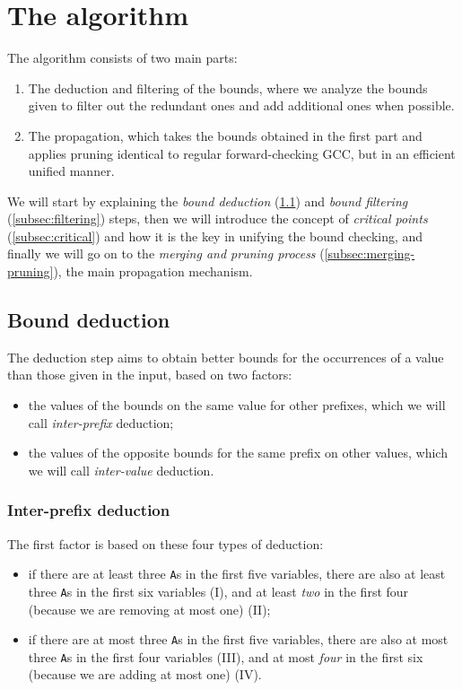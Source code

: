 \documentclass[a4paper,10pt]{article}
\begin{document}
\section{The algorithm}
The algorithm consists of two main parts:
\begin{enumerate}
    \item The deduction and filtering of the bounds, where we analyze the bounds given to filter out the redundant ones and add additional ones when possible.
    \item The propagation, which takes the bounds obtained in the first part and applies pruning identical to regular forward-checking GCC, but in an efficient unified manner.
\end{enumerate}

We will start by explaining the \emph{bound deduction} (\ref{subsec:deduction}) and \emph{bound filtering} (\ref{subsec:filtering}) steps, then we will introduce the concept of \emph{critical points} (\ref{subsec:critical}) and how it is the key in unifying the bound checking, and finally we will go on to the \emph{merging and pruning process} (\ref{subsec:merging-pruning}), the main propagation mechanism.

\subsection{Bound deduction}
\label{subsec:deduction}

The deduction step aims to obtain better bounds for the occurrences of a value than those given in the input, based on two factors:
\begin{itemize}
    \item the values of the bounds on the same value for other prefixes, which we will call \emph{inter-prefix} deduction;
    \item the values of the opposite bounds for the same prefix on other values, which we will call \emph{inter-value} deduction.
\end{itemize}

\subsubsection{Inter-prefix deduction}

The first factor is based on these four types of deduction:
\begin{itemize}
    \item if there are at least three \texttt{A}s in the first five variables, there are also at least three \texttt{A}s in the first six variables (I), and at least \emph{two} in the first four (because we are removing at most one) (II);
    \item if there are at most three \texttt{A}s in the first five variables, there are also at most three \texttt{A}s in the first four variables (III), and at most \emph{four} in the first six (because we are adding at most one) (IV).
\end{itemize}
\end{document}
